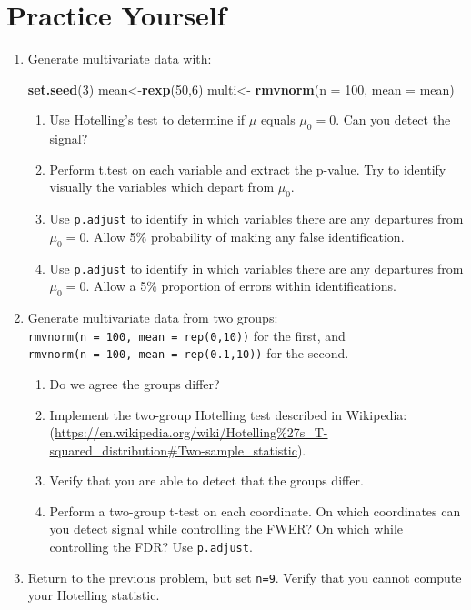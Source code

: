 \documentclass[]{book}
\newenvironment{Shaded}{\begin{snugshade}}{\end{snugshade}}
\newcommand{\DataTypeTok}[1]{\textcolor[rgb]{0.13,0.29,0.53}{#1}}
\newcommand{\DecValTok}[1]{\textcolor[rgb]{0.00,0.00,0.81}{#1}}
\newcommand{\KeywordTok}[1]{\textcolor[rgb]{0.13,0.29,0.53}{\textbf{#1}}}
\newcommand{\NormalTok}[1]{#1}
\newcommand{\StringTok}[1]{\textcolor[rgb]{0.31,0.60,0.02}{#1}}
\providecommand{\tightlist}{%
  \setlength{\itemsep}{0pt}\setlength{\parskip}{0pt}}
\theoremstyle{definition}
\theoremstyle{definition}
\theoremstyle{definition}
\theoremstyle{remark}
\begin{document}
\hypertarget{practice-yourself-5}{%
\section{Practice Yourself}\label{practice-yourself-5}}

\begin{enumerate}
\def\labelenumi{\arabic{enumi}.}
\item
  Generate multivariate data with:

\begin{Shaded}
\begin{Highlighting}[]
\KeywordTok{set.seed}\NormalTok{(}\DecValTok{3}\NormalTok{)}
\NormalTok{mean<-}\KeywordTok{rexp}\NormalTok{(}\DecValTok{50}\NormalTok{,}\DecValTok{6}\NormalTok{)}
\NormalTok{multi<-}\StringTok{  }\KeywordTok{rmvnorm}\NormalTok{(}\DataTypeTok{n =} \DecValTok{100}\NormalTok{, }\DataTypeTok{mean =}\NormalTok{ mean) }
\end{Highlighting}
\end{Shaded}

  \begin{enumerate}
  \def\labelenumii{\alph{enumii}.}
  \tightlist
  \item
    Use Hotelling's test to determine if \(\mu\) equals \(\mu_0=0\). Can you detect the signal?
  \item
    Perform t.test on each variable and extract the p-value. Try to identify visually the variables which depart from \(\mu_0\).
  \item
    Use \texttt{p.adjust} to identify in which variables there are any departures from \(\mu_0=0\). Allow 5\% probability of making any false identification.
  \item
    Use \texttt{p.adjust} to identify in which variables there are any departures from \(\mu_0=0\). Allow a 5\% proportion of errors within identifications.
  \end{enumerate}
\item
  Generate multivariate data from two groups: \texttt{rmvnorm(n\ =\ 100,\ mean\ =\ rep(0,10))} for the first, and \texttt{rmvnorm(n\ =\ 100,\ mean\ =\ rep(0.1,10))} for the second.

  \begin{enumerate}
  \def\labelenumii{\alph{enumii}.}
  \tightlist
  \item
    Do we agree the groups differ?
  \item
    Implement the two-group Hotelling test described in Wikipedia: (\url{https://en.wikipedia.org/wiki/Hotelling\%27s_T-squared_distribution\#Two-sample_statistic}).
  \item
    Verify that you are able to detect that the groups differ.
  \item
    Perform a two-group t-test on each coordinate. On which coordinates can you detect signal while controlling the FWER? On which while controlling the FDR? Use \texttt{p.adjust}.
  \end{enumerate}
\item
  Return to the previous problem, but set \texttt{n=9}. Verify that you cannot compute your Hotelling statistic.
\end{enumerate}
\end{document}
